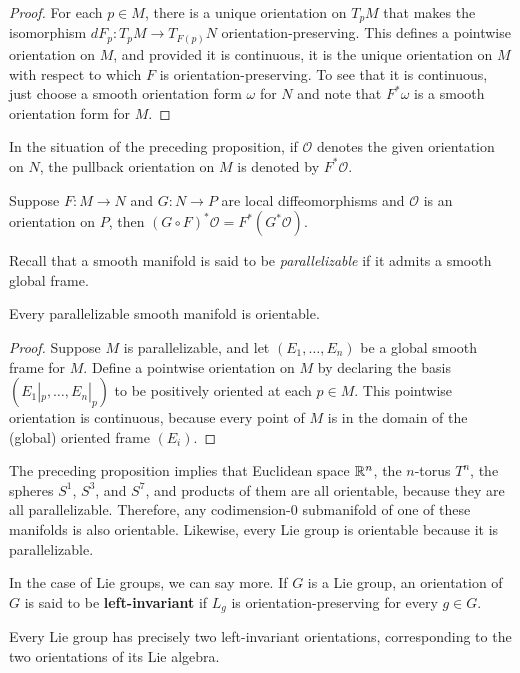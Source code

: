 \begin{proof}
For each $p\in M$, there is a unique orientation on $T_pM$ that makes the isomorphism
$dF_p:T_pM\to T_{F(p)}N$ orientation-preserving. This defines a pointwise orientation on $M$, and provided it is continuous, it is the unique orientation on $M$ with respect to which $F$ is orientation-preserving. To see that it is continuous, just
choose a smooth orientation form $\omega$ for $N$ and note that $F^*\omega$ is a smooth orientation form for $M$.
\end{proof}
In the situation of the preceding proposition, if $\mathcal{O}$ denotes the given orientation on $N$, the pullback orientation on $M$ is denoted by $F^*\mathcal{O}$.\par
\begin{proposition}
Suppose $F:M\to N$ and $G:N\to P$ are local diffeomorphisms and $\mathcal{O}$ is an orientation on $P$, then $(G\circ F)^*\mathcal{O}=F^*(G^*\mathcal{O})$.
\end{proposition}
Recall that a smooth manifold is said to be \textit{parallelizable} if it admits a smooth global frame.
\begin{proposition}
Every parallelizable smooth manifold is orientable.
\end{proposition}
\begin{proof}
Suppose $M$ is parallelizable, and let $(E_1,\dots,E_n)$ be a global smooth frame for $M$. Define a pointwise orientation on $M$ by declaring the basis $(E_1|_p,\dots,E_n|_p)$ to be positively oriented at each $p\in M$. This pointwise orientation is continuous, because every point of $M$ is in the domain of the (global) oriented frame $(E_i)$.
\end{proof}
\begin{example}
The preceding proposition implies that Euclidean space $\mathbb{R}^n$, the $n$-torus $T^n$, the spheres $S^1$, $S^3$, and $S^7$, and products of them are all orientable, because they are all parallelizable. Therefore, any codimension-$0$ submanifold of one of these manifolds is also orientable. Likewise, every Lie group is orientable because it is parallelizable.
\end{example}
In the case of Lie groups, we can say more. If $G$ is a Lie group, an orientation of $G$ is said to be \textbf{left-invariant} if $L_g$ is orientation-preserving for every $g\in G$.
\begin{proposition}
Every Lie group has precisely two left-invariant orientations, corresponding to the two orientations of its Lie algebra.
\end{proposition}
